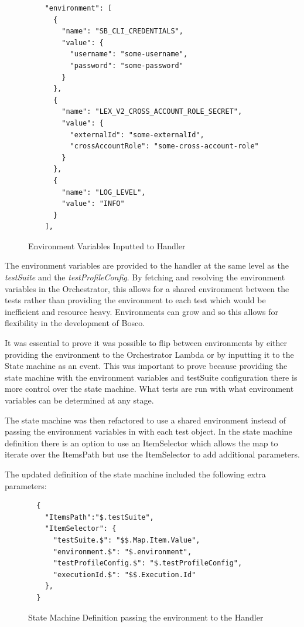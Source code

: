 \documentclass[12pt,a4paper,titlepage]{report}
\begin{document}
\begin{figure}[H]
  \begin{tcolorbox}
   \begin{verbatim}
    "environment": [
      {
        "name": "SB_CLI_CREDENTIALS",
        "value": {
          "username": "some-username",
          "password": "some-password"
        }
      },
      {
        "name": "LEX_V2_CROSS_ACCOUNT_ROLE_SECRET",
        "value": {
          "externalId": "some-externalId",
          "crossAccountRole": "some-cross-account-role"
        }
      },
      {
        "name": "LOG_LEVEL",
        "value": "INFO"
      }
    ],
 \end{verbatim}
  \end{tcolorbox}
  \caption{Environment Variables Inputted to Handler}
 \end{figure}

The environment variables are provided to the handler at the same level as the \textit{testSuite} and the \textit{testProfileConfig}. 
By fetching and resolving the environment variables in the Orchestrator, this allows for a shared environment between the tests rather 
than providing the environment to each test which would be inefficient and resource heavy. Environments can grow and so this allows 
for flexibility in the development of Bosco.

It was essential to prove it was possible to flip between environments by either providing the environment to the
Orchestrator Lambda or by inputting it to the State machine as an event. 
This was important to prove because providing the state machine with the environment variables and testSuite configuration there is more control over the state
machine. What tests are run with what environment variables can be determined at any stage.

The state machine was then refactored to use a shared environment instead of
passing the environment variables in with each test object. In the state machine definition there is an option to
use an ItemSelector which allows the map to iterate over the ItemsPath but use the ItemSelector to add additional
parameters.

The updated definition of the state machine included the following extra parameters:

\begin{figure}[H]
 \begin{tcolorbox}
  \begin{verbatim}
  {
    "ItemsPath":"$.testSuite",
    "ItemSelector": {
      "testSuite.$": "$$.Map.Item.Value",
      "environment.$": "$.environment",
      "testProfileConfig.$": "$.testProfileConfig",
      "executionId.$": "$$.Execution.Id"
    },
  }
\end{verbatim}
 \end{tcolorbox}
 \caption{State Machine Definition passing the environment to the Handler}
\end{figure}
\end{document}
